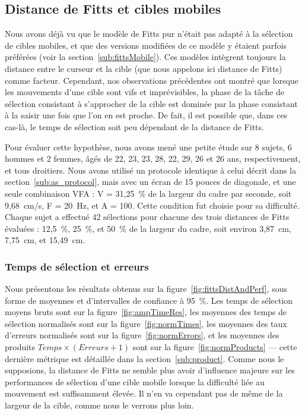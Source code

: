 	\subsection{Distance de Fitts et cibles mobiles}
	\label{sub:fittsDistance}
	Nous avons déjà vu que le modèle de Fitts pur n'était pas adapté à la sélection de cibles mobiles, et que des versions modifiées de ce modèle y étaient parfois préférées (voir la section~\ref{sub:fittsMobile}). Ces modèles intègrent toujours la distance entre le curseur et la cible (que nous appelons ici distance de Fitts) comme facteur. Cependant, nos observations précédentes ont montré que lorsque les mouvements d'une cible sont vifs et imprévisibles, la phase de la tâche de sélection consistant à s'approcher de la cible est dominée par la phase consistant à la saisir une fois que l'on en est proche. De fait, il est possible que, dans ces cas-là, le temps de sélection soit peu dépendant de la distance de Fitts.
	
	Pour évaluer cette hypothèse, nous avons mené une petite étude sur 8 sujets, 6 hommes et 2 femmes, âgés de 22, 23, 23, 28, 22, 29, 26 et 26 ans, respectivement, et tous droitiers. Nous avons utilisé un protocole identique à celui décrit dans la section~\ref{sub:as_protocol}, mais avec un écran de 15 pouces de diagonale, et une seule combinaison VFA : V = 31,25~\%{} de la largeur du cadre par seconde, soit 9,68~cm/s, F = 20~Hz, et A = 100\textdegree{}. Cette condition fut choisie pour sa difficulté. Chaque sujet a effectué 42 sélections pour chacune des trois distances de Fitts évaluées : 12,5~\%{}, 25~\%{}, et 50~\%{} de la largeur du cadre, soit environ 3,87~cm, 7,75~cm, et 15,49~cm.
	
	\subsubsection{Temps de sélection et erreurs}
	Nous présentons les résultats obtenus sur la figure~\ref{fig:fittsDistAndPerf}, sous forme de moyennes et d'intervalles de confiance à 95~\%{}. Les temps de sélection moyens bruts sont sur la figure~\ref{fig:ampTimeRes}, les moyennes des temps de sélection normalisés sont sur la figure~\ref{fig:normTimes}, les moyennes des taux d'erreurs normalisés sont sur la figure~\ref{fig:normErrors}, et les moyennes des produits $Temps\times(Erreurs+1)$ sont sur la figure~\ref{fig:normProducts} --- cette dernière métrique est détaillée dans la section~\ref{sub:product}. Comme nous le supposions, la distance de Fitts ne semble plus avoir d'influence majeure sur les performances de sélection d'une cible mobile lorsque la difficulté liée au mouvement est suffisamment élevée. Il n'en va cependant pas de même de la largeur de la cible, comme nous le verrons plus loin.

